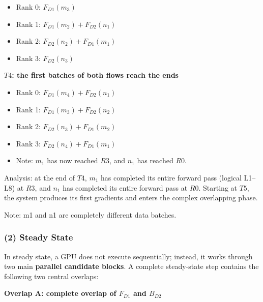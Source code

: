 \begin{itemize}
\tightlist
\item
  Rank 0: \(F_{D1}(m_3)\)
\item
  Rank 1: \(F_{D1}(m_2)+F_{D2}(n_1)\)
\item
  Rank 2: \(F_{D2}(n_2)+F_{D1}(m_1)\)
\item
  Rank 3: \(F_{D2}(n_3)\)
\end{itemize}

\textbf{\(T4\): the first batches of both flows reach the ends}

\begin{itemize}
\tightlist
\item
  Rank 0: \(F_{D1}(m_4)+F_{D2}(n_1)\)
\item
  Rank 1: \(F_{D1}(m_3)+F_{D2}(n_2)\)
\item
  Rank 2: \(F_{D2}(n_3)+F_{D1}(m_2)\)
\item
  Rank 3: \(F_{D2}(n_4)+F_{D1}(m_1)\)
\item
  Note: \(m_1\) has now reached \(R3\), and \(n_1\) has reached \(R0\).
\end{itemize}

Analysis: at the end of \(T4\), \(m_1\) has completed its entire forward pass (logical L1--L8) at \(R3\), and \(n_1\) has completed its entire forward pass at \(R0\). Starting at \(T5\), the system produces its first gradients and enters the complex overlapping phase.

Note: m1 and n1 are completely different data batches.

\hypertarget{steady-state}{%
\subsubsection{(2) Steady State}\label{steady-state}}

In steady state, a GPU does not execute sequentially; instead, it works through two main \textbf{parallel candidate blocks}. A complete steady-state step contains the following two central overlaps:

\textbf{Overlap A: complete overlap of \(F_{D1}\) and \(B_{D2}\)}

